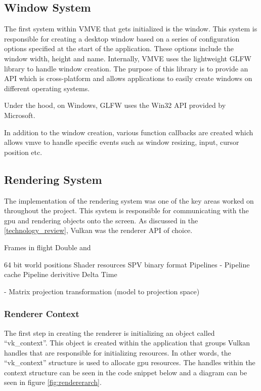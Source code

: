 \documentclass[11pt]{article}
\begin{document}
  

\subsection{Window System}
The first system within VMVE that gets initialized is the window. This system is
responsible for creating a desktop window based on a series of configuration
options specified at the start of the application. These options include the
window width, height and name. Internally, VMVE uses the lightweight GLFW
library to handle window creation. The purpose of this library is to provide an
API which is cross-platform and allows applications to easily create windows on
different operating systems. 

Under the hood, on Windows, GLFW uses the Win32 API provided by Microsoft.

In addition to the window creation, various function callbacks are created
which allows \gls{vmve} to handle specific events such as window resizing, input,
cursor position etc.

\subsection{Rendering System}
The implementation of the rendering system was one of the key areas worked on
throughout the project. This system is responsible for communicating with the
\gls{gpu} and rendering objects onto the screen. As discussed in the
\ref{technology_review}, Vulkan was the renderer API of choice. 

    Frames in flight 
    Double and

64 bit world positions 
Shader resources SPV binary format 
    Pipelines
-   Pipeline cache 
Pipeline derivitive 
Delta Time

- Matrix projection transformation (model to projection space)


\subsubsection{Renderer Context}
The first step in creating the renderer is initializing an object called
``vk\_context''. This object is created within the application that groups Vulkan
handles that are responsible for initializing resources. In other words, the
``vk\_context'' structure is used to allocate \gls{gpu} resources. The handles
within the context structure can be seen in the code snippet below and a diagram
can be seen in figure \ref{fig:rendererarch}.
\end{document}
